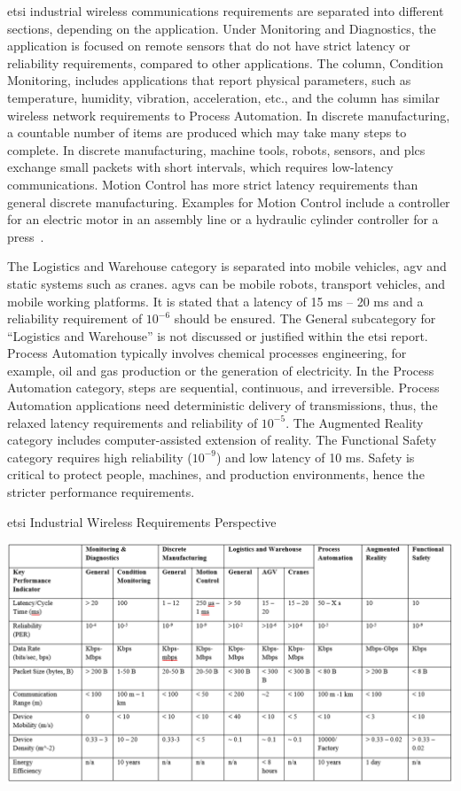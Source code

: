 \Gls{etsi} industrial wireless communications requirements are separated into different sections, depending on the application. Under Monitoring and Diagnostics, the application is focused on remote sensors that do not have strict latency or reliability requirements, compared to other applications. The column, Condition Monitoring, includes applications that report physical parameters, such as temperature, humidity, vibration, acceleration, etc., and the column has similar wireless network requirements to Process Automation. In discrete manufacturing, a countable number of items are produced which may take many steps to complete. In discrete manufacturing, machine tools, robots, sensors, and \glspl{plc} exchange small packets with short intervals, which requires low-latency communications. Motion Control has more strict latency requirements than general discrete manufacturing. Examples for Motion Control include a controller for an electric motor in an assembly line or a hydraulic cylinder controller for a press~\cite{etsi103588}.

The Logistics and Warehouse category is separated into mobile vehicles, \gls{agv} and static systems such as cranes. \Glspl{agv} can be mobile robots, transport vehicles, and mobile working platforms. It is stated that a latency of 15 ms – 20 ms and a reliability requirement of $10^{-6}$ should be ensured. The General subcategory for “Logistics and Warehouse” is not discussed or justified within the \gls{etsi} report. Process Automation typically involves chemical processes engineering, for example, oil and gas production or the generation of electricity. In the Process Automation category, steps are sequential, continuous, and irreversible. Process Automation applications need deterministic delivery of transmissions, thus, the relaxed latency requirements and reliability of $10^{-5}$. The Augmented Reality category includes computer-assisted extension of reality. The Functional Safety category requires high reliability ($10^{-9}$) and low latency of 10 ms. Safety is critical to protect people, machines, and production environments, hence the stricter performance requirements. 

\begin{table}[!tb]
	\centering
	\caption{\gls{etsi} Industrial Wireless Requirements Perspective}
	\label{soa:ets-reqts-persp}	
	\includegraphics[width=\textwidth]{chapter-soa/etsi-reqts}
\end{table}

